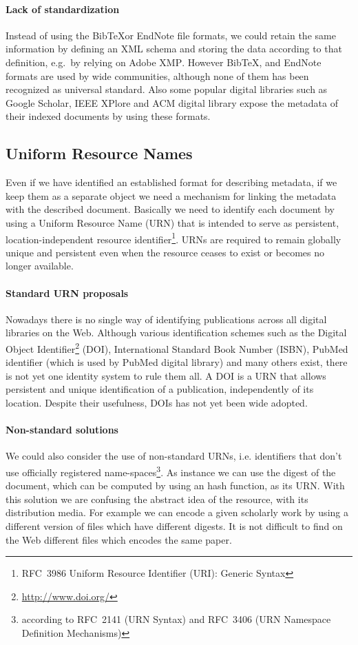\paragraph{Lack of standardization}Instead of using the Bib\TeX or EndNote file formats, we could retain the same information by defining an XML schema and storing the data according to that definition, e.g.\ by relying on Adobe \textsc{XMP}. However Bib\TeX, and EndNote formats are used by wide communities, although none of them has been recognized as universal standard. Also some popular digital libraries such as Google Scholar, IEEE XPlore and ACM digital library expose the metadata of their indexed documents by using these formats.

\subsection{\label{subsec:urn_issues}Uniform Resource Names}
Even if we have identified an established format for describing metadata, if we keep them as a separate object we need a mechanism for linking the metadata with the described document. Basically we need to identify each document by using a Uniform Resource Name (URN) that is intended to serve as persistent, location-independent resource identifier\footnote{RFC~3986 Uniform Resource Identifier (URI): Generic Syntax}. URNs are required to remain globally unique and persistent even when the resource ceases to exist or becomes no longer available.

\paragraph{Standard URN proposals}Nowadays there is no single way of identifying publications across all digital libraries on the Web. Although various identification schemes such as the Digital Object Identifier\footnote{\url{http://www.doi.org/}} (DOI), International Standard Book Number (ISBN), PubMed identifier (which is used by PubMed digital library) and many others exist, there is not yet one identity system to rule them all. A DOI is a URN that allows persistent and unique identification of a publication, independently of its location. Despite their usefulness, DOIs has not yet been wide adopted.

\paragraph{Non-standard solutions}We could also consider the use of non-standard URNs, i.e. identifiers that don't use officially registered name-spaces\footnote{according to RFC~2141 (URN Syntax) and RFC~3406 (URN Namespace Definition Mechanisms)}. As instance we can use the digest of the document,  which can be computed by using an hash function, as its URN. With this solution we are confusing the abstract idea of the resource, with its distribution media. For example we can encode a given scholarly work by using a different version of files which have different digests. It is not difficult to find on the Web different files which encodes the same paper.

